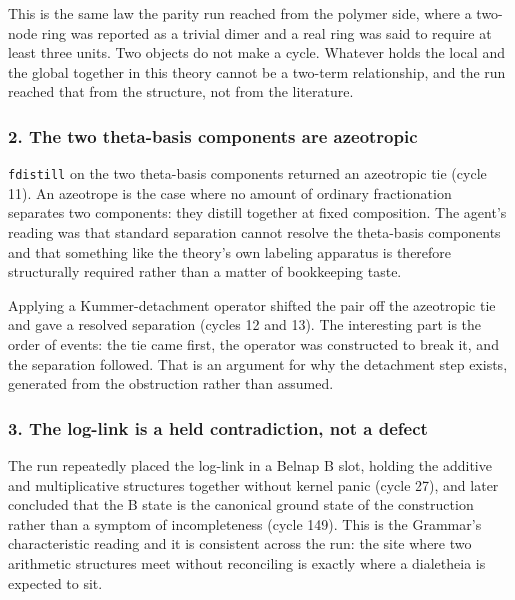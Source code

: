 \documentclass[12pt,a4paper]{article}
\begin{document}
This is the same law the parity run reached from the polymer side, where
a two-node ring was reported as a trivial dimer and a real ring was said
to require at least three units. Two objects do not make a cycle.
Whatever holds the local and the global together in this theory cannot
be a two-term relationship, and the run reached that from the structure,
not from the literature.

\hypertarget{the-two-theta-basis-components-are-azeotropic}{%
\subsubsection{2. The two theta-basis components are
azeotropic}\label{the-two-theta-basis-components-are-azeotropic}}

\texttt{fdistill} on the two theta-basis components returned an
azeotropic tie (cycle 11). An azeotrope is the case where no amount of
ordinary fractionation separates two components: they distill together
at fixed composition. The agent's reading was that standard separation
cannot resolve the theta-basis components and that something like the
theory's own labeling apparatus is therefore structurally required
rather than a matter of bookkeeping taste.

Applying a Kummer-detachment operator shifted the pair off the
azeotropic tie and gave a resolved separation (cycles 12 and 13). The
interesting part is the order of events: the tie came first, the
operator was constructed to break it, and the separation followed. That
is an argument for why the detachment step exists, generated from the
obstruction rather than assumed.

\hypertarget{the-log-link-is-a-held-contradiction-not-a-defect}{%
\subsubsection{3. The log-link is a held contradiction, not a
defect}\label{the-log-link-is-a-held-contradiction-not-a-defect}}

The run repeatedly placed the log-link in a Belnap B slot, holding the
additive and multiplicative structures together without kernel panic
(cycle 27), and later concluded that the B state is the canonical ground
state of the construction rather than a symptom of incompleteness (cycle
149). This is the Grammar's characteristic reading and it is consistent
across the run: the site where two arithmetic structures meet without
reconciling is exactly where a dialetheia is expected to sit.
\end{document}
